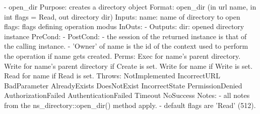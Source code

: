 \begin{myspec}
    - open_dir
      Purpose:  creates a directory object
      Format:   open_dir           (in  url       name,
                                    in  int       flags = Read,
                                    out directory dir)
      Inputs:   name:               name of directory to open
                flags:              flags defining operation
                                    modus
      InOuts:   -
      Outputs:  dir:                opened directory instance
      PreCond:  -
      PostCond: - the session of the returned instance is that of
                  the calling instance.
                - 'Owner' of name is the id of the context
                  used to perform the operation if name gets
                  created.
      Perms:    Exec  for name's parent directory.
                Write for name's parent directory if Create is set.
                Write for name if Write is set.
                Read  for name if Read  is set.
      Throws:   NotImplemented
                IncorrectURL
                BadParameter
                AlreadyExists
                DoesNotExist
                IncorrectState
                PermissionDenied
                AuthorizationFailed
                AuthenticationFailed
                Timeout
                NoSuccess
      Notes:    - all notes from the ns_directory::open_dir()
                  method apply.
                - default flags are 'Read' (512).
 

\end{myspec}
